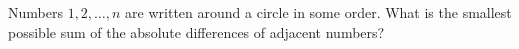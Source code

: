 Numbers $1, 2, \dots , n$ are written around a circle in some order. What is the smallest possible sum of the absolute differences of adjacent numbers?